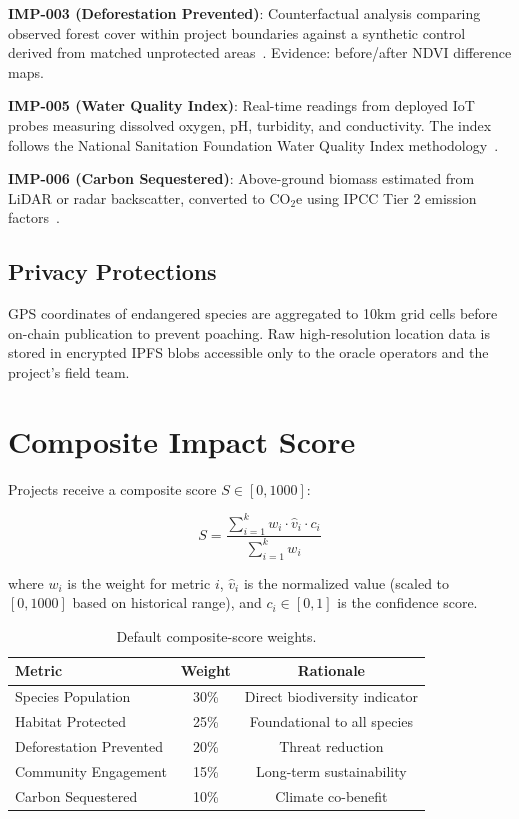 \documentclass[11pt,letterpaper]{article}
\begin{document}
\textbf{IMP-003 (Deforestation Prevented)}: Counterfactual analysis comparing observed forest cover within project boundaries against a synthetic control derived from matched unprotected areas~\cite{andam2008}. Evidence: before/after NDVI difference maps.

\textbf{IMP-005 (Water Quality Index)}: Real-time readings from deployed IoT probes measuring dissolved oxygen, pH, turbidity, and conductivity. The index follows the National Sanitation Foundation Water Quality Index methodology~\cite{brown1970}.

\textbf{IMP-006 (Carbon Sequestered)}: Above-ground biomass estimated from LiDAR or radar backscatter, converted to CO$_2$e using IPCC Tier 2 emission factors~\cite{ipcc2019}.

\subsection{Privacy Protections}

GPS coordinates of endangered species are aggregated to 10km grid cells before on-chain publication to prevent poaching. Raw high-resolution location data is stored in encrypted IPFS blobs accessible only to the oracle operators and the project's field team.

\section{Composite Impact Score}
\label{sec:scoring}

Projects receive a composite score $S \in [0, 1000]$:

\begin{equation}
S = \frac{\sum_{i=1}^{k} w_i \cdot \hat{v}_i \cdot c_i}{\sum_{i=1}^{k} w_i}
\label{eq:composite}
\end{equation}

where $w_i$ is the weight for metric $i$, $\hat{v}_i$ is the normalized value (scaled to $[0, 1000]$ based on historical range), and $c_i \in [0,1]$ is the confidence score.

\begin{table}[t]
\centering
\begin{tabular}{lcc}
\toprule
\textbf{Metric} & \textbf{Weight} & \textbf{Rationale} \\
\midrule
Species Population & 30\% & Direct biodiversity indicator \\
Habitat Protected & 25\% & Foundational to all species \\
Deforestation Prevented & 20\% & Threat reduction \\
Community Engagement & 15\% & Long-term sustainability \\
Carbon Sequestered & 10\% & Climate co-benefit \\
\bottomrule
\end{tabular}
\caption{Default composite-score weights.}
\label{tab:weights}
\end{table}
\end{document}
